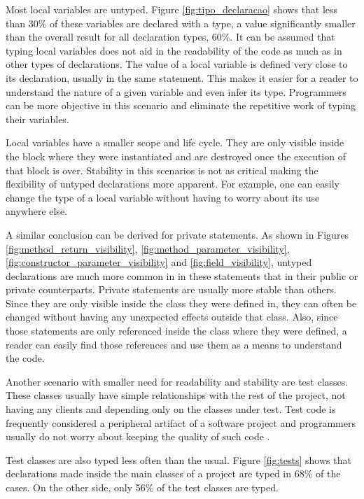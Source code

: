 \documentclass[preprint]{sigplanconf}
\begin{document}
Most local variables are untyped.
Figure \ref{fig:tipo_declaracao} shows that less than 30\% of these variables are declared with a type, a value significantly smaller than the overall result for all declaration types, 60\%.
It can be assumed that typing local variables does not aid in the readability of the code as much as in other types of declarations.
The value of a local variable is defined very close to its declaration, usually in the same statement.
This makes it easier for a reader to understand the nature of a given variable and even infer its type.
Programmers can be more objective in this scenario and eliminate the repetitive work of typing their variables.

Local variables have a smaller scope and life cycle.
They are only visible inside the block where they were instantiated and are destroyed once the execution of that block is over.
Stability in this scenarios is not as critical making the flexibility of untyped declarations more apparent.
For example, one can easily change the type of a local variable without having to worry about its use anywhere else.

A similar conclusion can be derived for private statements.
As shown in Figures \ref{fig:method_return_visibility}, \ref{fig:method_parameter_visibility}, \ref{fig:constructor_parameter_visibility} and \ref{fig:field_visibility}, untyped declarations are much more common in in these statements that in their public or private counterparts.
Private statements are usually more stable than others.
Since they are only visible inside the class they were defined in, they can often be changed without having any unexpected effects outside that class.
Also, since those statements are only referenced inside the class where they were defined, a reader can easily find those references and use them as a means to understand the code.

Another scenario with smaller need for readability and stability are test classes.
These classes usually have simple relationships with the rest of the project, not having any clients and depending only on the classes under test.
Test code is frequently considered a peripheral artifact of a software project and programmers usually do not worry about keeping the quality of such code \cite{Meszaros07}.

Test classes are also typed less often than the usual.
Figure \ref{fig:tests} shows that declarations made inside the main classes of a project are typed in 68\% of the cases.
On the other side, only 56\% of the test classes are typed.
\end{document}
